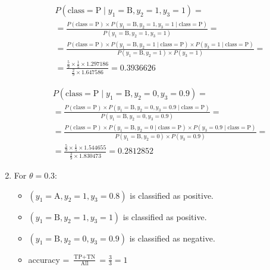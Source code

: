 \documentclass[12pt,a4paper]{article}
\begin{document}
\begin{enumerate}
	      \begin{align*}
		       & P(\text{class}=\text{P} \mid y_1=\text{B}, y_2=1, y_3=1) =                                                                                                                      \\
		       & = \frac{P(\text{class}=\text{P}) \times P(y_1=\text{B}, y_2=1, y_3=1 \mid \text{class}=\text{P})}{P(y_1=\text{B}, y_2=1, y_3=1)} =                                              \\
		       & = \frac{P(\text{class}=\text{P}) \times P(y_1=\text{B}, y_2=1 \mid \text{class}=\text{P}) \times P(y_3=1 \mid \text{class}=\text{P})}{P(y_1=\text{B}, y_2=1) \times P(y_3=1)} = \\
		       & = \frac{\frac{5}{9} \times \frac{1}{5} \times 1.297186}{\frac{2}{9} \times 1.647586} = 0.3936626
	      \end{align*}

	      \begin{align*}
		       & P(\text{class}=\text{P} \mid y_1=\text{B}, y_2=0, y_3=0.9) =                                                                                                                        \\
		       & = \frac{P(\text{class}=\text{P}) \times P(y_1=\text{B}, y_2=0, y_3=0.9 \mid \text{class}=\text{P})}{P(y_1=\text{B}, y_2=0, y_3=0.9)} =                                              \\
		       & = \frac{P(\text{class}=\text{P}) \times P(y_1=\text{B}, y_2=0 \mid \text{class}=\text{P}) \times P(y_3=0.9 \mid \text{class}=\text{P})}{P(y_1=\text{B}, y_2=0) \times P(y_3=0.9)} = \\
		       & = \frac{\frac{5}{9} \times \frac{1}{5} \times 1.544655}{\frac{3}{9} \times 1.830473} = 0.2812852
	      \end{align*}
	      \endgroup

	      \pagebreak

	\item
	      For $\theta = 0.3$:
	      \begin{itemize}[label={}]
		      \item $(y_1=\text{A}, y_2=1, y_3=0.8)$ is classified as positive.
		      \item $(y_1=\text{B}, y_2=1, y_3=1)$ is classified as positive.
		      \item $(y_1=\text{B}, y_2=0, y_3=0.9)$ is classified as negative.
		      \item accuracy = $\frac{\text{TP} + \text{TN}}{\text{All}} = \frac{3}{3} = 1$
	      \end{itemize}


\end{enumerate}
\end{document}
